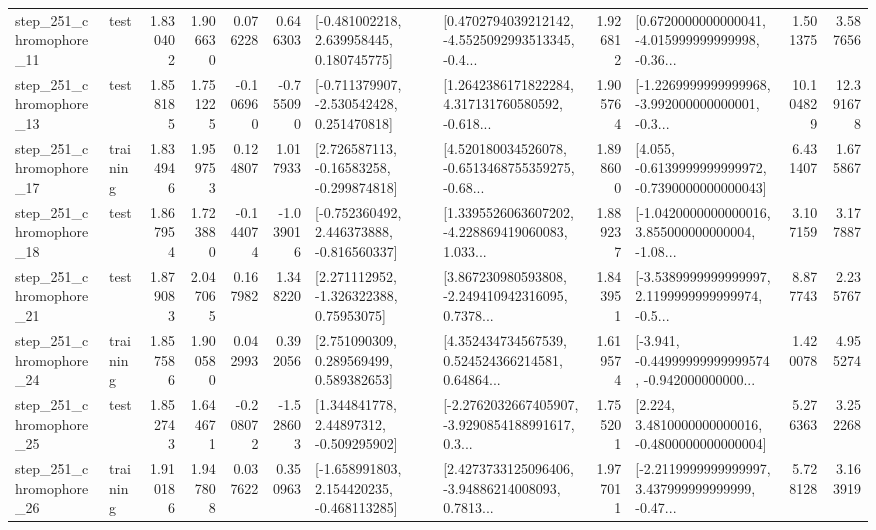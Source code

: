 \begin{tabular}{llrrrrllrlrr}
  step\_251\_chromophore\_11 &      test &      1.830402 &    1.906630 &      0.076228 &  0.646303 &    [-0.481002218, 2.639958445, 0.180745775] &  [0.4702794039212142, -4.5525092993513345, -0.4... &       1.926812 &  [0.6720000000000041, -4.015999999999998, -0.36... &            1.501375 &          3.587656 \\
  step\_251\_chromophore\_13 &      test &      1.858185 &    1.751225 &     -0.106960 & -0.755090 &   [-0.711379907, -2.530542428, 0.251470818] &  [1.2642386171822284, 4.317131760580592, -0.618... &       1.905764 &  [-1.2269999999999968, -3.992000000000001, -0.3... &           10.104829 &         12.391678 \\
  step\_251\_chromophore\_17 &  training &      1.834946 &    1.959753 &      0.124807 &  1.017933 &    [2.726587113, -0.16583258, -0.299874818] &  [4.520180034526078, -0.6513468755359275, -0.68... &       1.898600 &  [4.055, -0.6139999999999972, -0.7390000000000043] &            6.431407 &          1.675867 \\
  step\_251\_chromophore\_18 &      test &      1.867954 &    1.723880 &     -0.144074 & -1.039016 &   [-0.752360492, 2.446373888, -0.816560337] &  [1.3395526063607202, -4.228869419060083, 1.033... &       1.889237 &  [-1.0420000000000016, 3.855000000000004, -1.08... &            3.107159 &          3.177887 \\
  step\_251\_chromophore\_21 &      test &      1.879083 &    2.047065 &      0.167982 &  1.348220 &     [2.271112952, -1.326322388, 0.75953075] &  [3.867230980593808, -2.249410942316095, 0.7378... &       1.843951 &  [-3.5389999999999997, 2.1199999999999974, -0.5... &            8.877743 &          2.235767 \\
  step\_251\_chromophore\_24 &  training &      1.857586 &    1.900580 &      0.042993 &  0.392056 &     [2.751090309, 0.289569499, 0.589382653] &  [4.352434734567539, 0.524524366214581, 0.64864... &       1.619574 &  [-3.941, -0.44999999999999574, -0.942000000000... &            1.420078 &          4.955274 \\
  step\_251\_chromophore\_25 &      test &      1.852743 &    1.644671 &     -0.208072 & -1.528603 &     [1.344841778, 2.44897312, -0.509295902] &  [-2.2762032667405907, -3.9290854188991617, 0.3... &       1.755201 &   [2.224, 3.4810000000000016, -0.4800000000000004] &            5.276363 &          3.252268 \\
  step\_251\_chromophore\_26 &  training &      1.910186 &    1.947808 &      0.037622 &  0.350963 &   [-1.658991803, 2.154420235, -0.468113285] &  [2.4273733125096406, -3.94886214008093, 0.7813... &       1.977011 &  [-2.2119999999999997, 3.437999999999999, -0.47... &            5.728128 &          3.163919 \\

\end{tabular}
